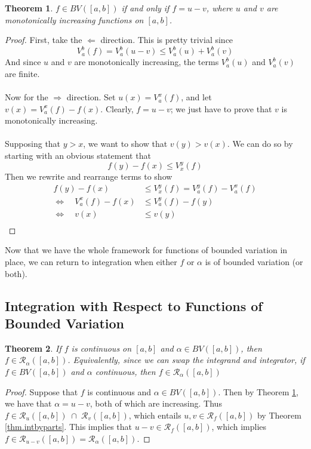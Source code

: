 \documentclass[12pt]{article}
\theoremstyle{plain}
\newtheorem{thm}{Theorem}[subsection]
\theoremstyle{definition}
\theoremstyle{remark}
\begin{document}
\begin{thm}
\label{monot}
$f\in BV([a,b])$ if and only if $f = u-v$, where $u$ and $v$ are monotonically increasing functions on $[a,b]$. 
\end{thm}
\begin{proof}
First, take the $\Leftarrow$ direction. This is pretty trivial since 
    \[ V_a^b(f) = V_a^b(u-v) \leq V_a^b(u) + V_a^b(v) \]
And since $u$ and $v$ are monotonically increasing, the terms $V_a^b(u)$ and $V_a^b(v)$ are finite.
\\
\\
Now for the $\Rightarrow$ direction. Set $u(x) = V_a^x(f)$, and let $v(x)=V_a^x(f) - f(x)$. Clearly, $f = u-v$; we just have to prove that $v$ is monotonically increasing.
\\
\\
Supposing that $y>x$, we want to show that $v(y) > v(x)$. We can do so by starting with an obvious statement that 
    \[ f(y) - f(x) \leq V_x^y(f) \]
Then we rewrite and rearrange terms to show
\begin{align*}
    f(y) - f(x) &\leq V_x^y(f) = V_a^y(f) - V_a^x(f)  \\
    \Leftrightarrow\quad V_a^x(f) - f(x) &\leq V_a^y(f) - f(y)  \\
    \Leftrightarrow\quad v(x) &\leq v(y)  \\
\end{align*}
\end{proof}

Now that we have the whole framework for functions of bounded variation in place, we can return to integration when either $f$ or $\alpha$ is of bounded variation (or both). 

\subsection{Integration with Respect to Functions of Bounded Variation}

\begin{thm}
If $f$ is continuous on $[a,b]$ and $\alpha\in BV([a,b])$, then $f\in\mathscr{R}_\alpha([a,b])$. Equivalently, since we can swap the integrand and integrator, if $f\in BV([a,b])$ and $\alpha$ continuous, then $f\in\mathscr{R}_\alpha([a,b])$
\end{thm}
\begin{proof}
Suppose that $f$ is continuous and $\alpha\in BV([a,b])$. Then by Theorem \ref{monot}, we have that $\alpha = u -v$, both of which are increasing. Thus $f\in\mathscr{R}_u([a,b]) \;\cap \;\mathscr{R}_v([a,b])$, which entails $u, v \in \mathscr{R}_f([a,b])$ by Theorem \ref{thm.intbyparts}.  This implies that $u-v\in\mathscr{R}_f([a,b])$, which implies $f\in\mathscr{R}_{u-v}([a,b]) = \mathscr{R}_\alpha([a,b])$.
\end{proof}
\end{document}
